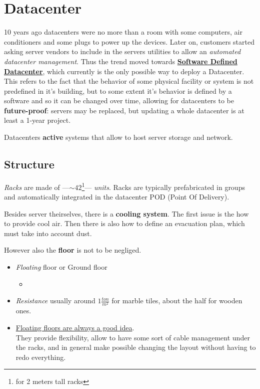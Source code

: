 \chapter{Datacenter}
10 years ago datacenters were no more than a room with some computers, air conditioners and some plugs to power up the devices.
Later on, customers started asking server vendors to include in the servers utilities to allow an \textit{automated datacenter management}.
Thus the trend moved towards \textbf{\ul{Software Defined Datacenter}}, which currently is the only possible way to deploy a Datacenter.
This refers to the fact that the behavior of some physical facility or system is not predefined in it’s building, but
to some extent it’s behavior is defined by a software and so it can be changed
over time, allowing for datacenters to be \textbf{future-proof}: servers may be replaced, but updating a whole datacenter is at least a 1-year project.

Datacenters \textbf{active} systems that allow to host server storage and network.


\section{Structure}
\textit{Racks} are made of ---$\sim 42$\footnote{for 2 meters tall racks}--- \textit{units}.
Racks are typically prefabricated in groups and automatically integrated in the datacenter POD (Point Of Delivery).\\

Besides server theirselves, there is a \textbf{cooling system}.
The first issue is the how to provide cool air. Then there is also how to define an evacuation plan, which must take into account dust.

However also the \textbf{floor} is not to be negliged.
\begin{itemize}
   \item \textit{Floating} floor or Ground floor
   \begin{itemize}
      \item 
   \end{itemize}
   \item \textit{Resistance} usually around $1 \frac{ton}{m^2}$  for marble tiles, about the half for wooden ones.
   \item \ul{Floating floors are always a good idea}.\\
   They provide flexibility, allow to have some sort of cable management under the racks, and in general make possible changing the layout without having to redo everything.
\end{itemize}

